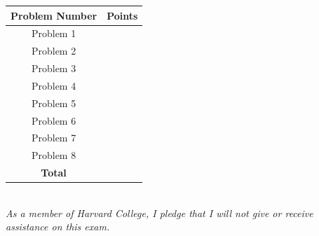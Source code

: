 \documentclass{article}
\begin{document}
    \centering
    \begin{tabular}{|c|c|}
    \hline
      \textbf{Problem Number}   & \textbf{Points}  \\
             \hline \hline
                Problem 1   &   \\
            \hline
                 Problem 2 &   \\
        \hline 
                Problem 3 &   \\
        \hline 
                Problem 4 &   \\
        \hline 
                Problem 5 &   \\
        \hline 
         Problem 6 &   \\
        \hline 
         Problem 7 &   \\
        \hline 
        Problem 8 &   \\
        \hline
               
               
         \textbf{Total} &   \\
         \hline 
    \end{tabular}\\
\vspace{0.5in}
\emph{As a member of Harvard College, I pledge that I will not give or receive assistance on this exam.}\\
\\

\newpage
\end{document}
